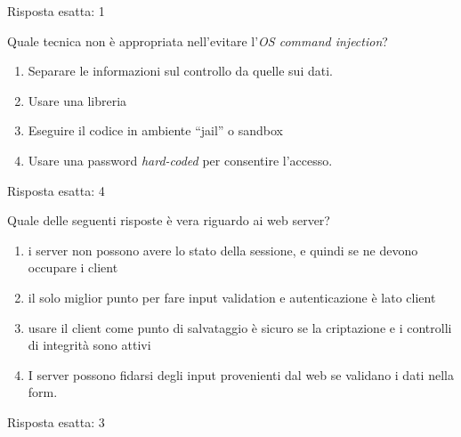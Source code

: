 \begin{Answer} [
  ref={esControlli2},
  number={2}
  ]

  \Question Risposta esatta: 1
\end{Answer}

\begin{Exercise} [
  title={Quiz},
  label={esControlli3}
  ]

  \Question Quale tecnica non è appropriata nell'evitare
  l'\textit{OS command injection}?
\begin{enumerate}
\item Separare le informazioni sul controllo da quelle sui dati.
\item Usare una libreria
\item Eseguire il codice in ambiente ``jail'' o sandbox
\item Usare una password \textit{hard-coded} per consentire l'accesso.
\end{enumerate}


\end{Exercise}

\begin{Answer} [
  ref={esControlli3},
  number={3}
  ]

  \Question Risposta esatta: 4
\end{Answer}


\begin{Exercise} [
  title={Quiz},
  label={esControlli4}
  ]

  \Question Quale delle seguenti risposte è vera riguardo ai web server?
  \begin{enumerate}
   \item i server non possono avere lo stato della sessione, e quindi se ne
devono occupare i client
   \item il solo miglior punto per fare input validation e autenticazione è
lato client
   \item usare il client come punto di salvataggio è sicuro se la criptazione
e i controlli di integrità sono attivi
   \item I server possono fidarsi degli input provenienti dal web se validano i
dati nella form.
  \end{enumerate}
\end{Exercise}

\begin{Answer} [
  ref={esControlli4},
  number={4}
  ]

  \Question Risposta esatta: 3
\end{Answer}

